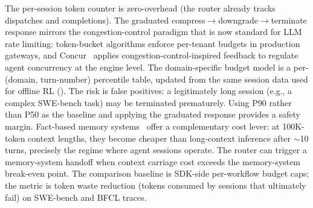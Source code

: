 \begin{opportunity}
\begin{frisk}
The per-session token counter is zero-overhead (the router already
tracks dispatches and completions).  The graduated
compress$\to$downgrade$\to$terminate response mirrors the
congestion-control paradigm that is now standard for LLM rate
limiting: token-bucket algorithms enforce per-tenant budgets in
production gateways, and Concur~\cite{concur2026} applies
congestion-control-inspired feedback to regulate agent concurrency
at the engine level.  The domain-specific budget model is a
per-(domain, turn-number) percentile table, updated from the same
session data used for offline RL ().
The risk is false positives: a legitimately long session (e.g., a
complex SWE-bench task) may be terminated prematurely.  Using P90
rather than P50 as the baseline and applying the graduated
response provides a safety margin.  Fact-based memory
systems~\cite{memcost2026} offer a complementary cost lever: at
100K-token context lengths, they become cheaper than long-context
inference after $\sim$10 turns, precisely the regime where agent
sessions operate.  The router can trigger a memory-system handoff
when context carriage cost exceeds the memory-system break-even
point.  The comparison baseline is SDK-side per-workflow budget
caps; the metric is token waste reduction (tokens consumed by
sessions that ultimately fail) on SWE-bench and BFCL traces.
\end{frisk}
\end{opportunity}

